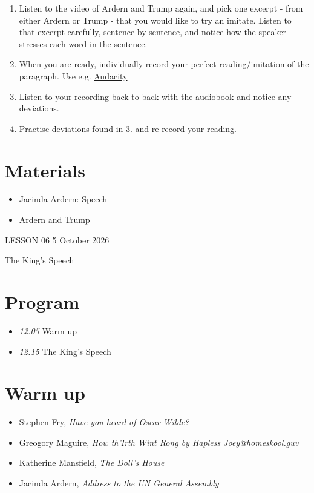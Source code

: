 \documentclass[11pt,a4paper,oneside]{book}
\begin{document}
\begin{enumerate}
\item Listen to the video of Ardern and Trump again, and pick one excerpt - from either Ardern or Trump - that you would like to try an imitate. Listen to that excerpt carefully, sentence by sentence, and notice how the speaker stresses each word in the sentence.
\item When you are ready, individually record your perfect reading/imitation of the paragraph. Use e.g. \href{https://wavacity.com/}{Audacity}
\item Listen to your recording back to back with the audiobook and notice any deviations.
\item Practise deviations found in 3. and re-record your reading.
\end{enumerate}

\section*{Materials}

\begin{itemize}
\item Jacinda Ardern: Speech
\item Ardern and Trump
\end{itemize}

\clearpage{}
{\color{blue}\small LESSON 06 \hfill 5 October 2026\par}
\vspace{4mm}
{\displayfont\color{navy}\fontsize{30}{34}\selectfont The King's Speech\par}\vspace{4mm}

\section*{Program}

\begin{itemize}
\item \emph{12.05} Warm up
\item \emph{12.15} The King's Speech
\end{itemize}

\section*{Warm up}

\begin{itemize}
\item Stephen Fry, \emph{Have you heard of Oscar Wilde?}
\item Greogory Maguire, \emph{How th'Irth Wint Rong by Hapless Joey@homeskool.guv}
\item Katherine Mansfield, \emph{The Doll's House}
\item Jacinda Ardern, \emph{Address to the UN General Assembly}
\end{itemize}
\end{document}
